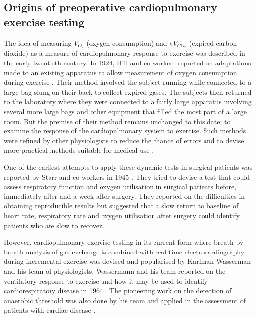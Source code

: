 \subsection{Origins of preoperative cardiopulmonary exercise testing}

The idea of measuring $\dot{V}_{O_2}$ (oxygen consumption) and v$\dot{V}_{CO_2}$ (expired carbon-dioxide) as a measure of cardiopulmonary response to exercise was described in the early twentieth century. 
In 1924, Hill and co-workers reported on adaptations made to an existing apparatus to allow measurement of oxygen consumption during exercise \parencite{hill_muscular_1924}. 
Their method involved the subject running while connected to a large bag slung on their back to collect expired gases. 
The subjects then returned to the laboratory where they were connected to a fairly large apparatus involving several more large bags and other equipment that filled the most part of a large room. 
But the premise of their method remains unchanged to this date; to examine the response of the cardiopulmonary system to exercise.
Such methods were refined by other physiologists to reduce the chance of errors and to devise more practical methods suitable for medical use \parencite{katz_ln_metabolic_1934, sutton_estimation_1940}.

One of the earliest attempts to apply these dynamic tests in surgical patients was reported by Starr and co-workers in 1945 \parencite{starr_convalescence_1945}.
They tried to devise a test that could assess respiratory function and oxygen utilisation in surgical patients before, immediately after and a week after surgery. 
They reported on the difficulties in obtaining reproducible results but suggested that a slow return to baseline of heart rate, respiratory rate and oxygen utilisation after surgery could identify patients who are slow to recover. 

However, cardiopulmonary exercise testing in its current form where breath-by-breath analysis of gas exchange is combined with real-time electrocardiography during incremental exercise was devised and popularised by Karlman Wasserman and his team of physiologists.
Wassermann and his team reported on the ventilatory response to exercise and how it may be used to identify cardiorespiratory disease in 1964 \parencite{naimark_continuous_1964}.
The pioneering work on the detection of anaerobic threshold was also done by his team and applied in the assessment of patients with cardiac disease \parencite{wasserman_detecting_1964, wasserman_lactate_1967, wasserma.k_anaerobic_1973}.

